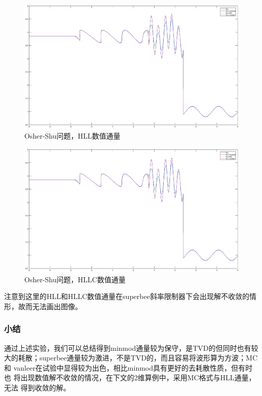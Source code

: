 \documentclass[a4paper,  11pt]{ctexart}
\begin{document}
\begin{figure}[H]
  \begin{center}
\includegraphics[width=\textwidth]{./images/EulerShu-HLL.eps}
    \caption{Osher-Shu问题，HLL数值通量}
  \end{center}
\end{figure}
\begin{figure}[H]
  \begin{center}
\includegraphics[width=\textwidth]{./images/EulerShu-HLL.eps}
    \caption{Osher-Shu问题，HLLC数值通量}
  \end{center}
\end{figure}
注意到这里的HLL和HLLC数值通量在superbee斜率限制器下会出现解不收敛的情
形，故而无法画出图像。
\subsubsection{小结}
通过上述实验，我们可以总结得到minmod通量较为保守，是TVD的但同时也有较
大的耗散；superbee通量较为激进，不是TVD的，而且容易将波形算为方波；MC和
vanleer在试验中显得较为出色，相比minmod具有更好的去耗散性质，但有时也
将出现数值解不收敛的情况，在下文的2维算例中，采用MC格式与HLL通量，无法
得到收敛的解。
\end{document}

